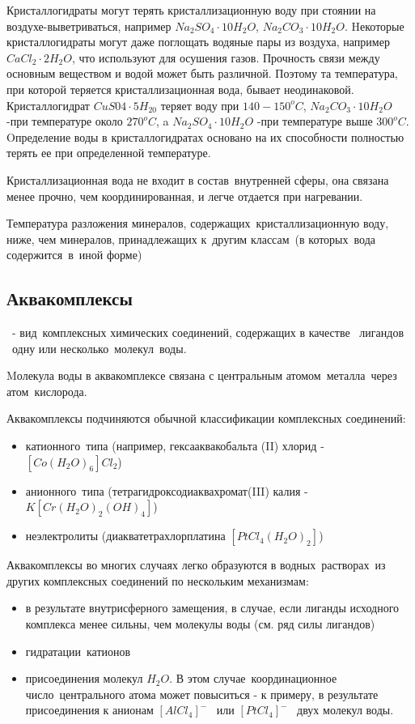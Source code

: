 \documentclass[11pt]{article}
\begin{document}
Кристаллогидраты могут терять кристаллизационную воду при стоянии на
воздухе-выветриваться, например $Na_2SO_4 \cdot 10H_2O$, $Na_2CO_3 \cdot 10H_2O$. Hекоторые
кристаллогидраты могут даже поглощать водяные пары из воздуха, например $CaCl_2 \cdot 2H_2O$, что используют для осушения газов. Прочность связи между основным
веществом и водой может быть различной. Поэтому та температура, при которой
теряется кристаллизационная вода, бывает неодинаковой. Кристаллогидрат $CuS04\cdot 5H_20$ теряет воду при $140-150^oC$, $Na_2CO_3\cdot 10H_2O$ -при температуре около $270^o C$, a
$Na_2SO_4\cdot 10H_2O$ -при температуре выше $300^o C$. Oпределение воды в
кристаллогидратах основано на их способности полностью терять ее при
определенной температуре. 

Кристаллизационная вода не входит в состав внутренней сферы, она связана менее прочно, чем координированная, и легче отдается при нагревании.

Температура разложения минералов, содержащих кристаллизационную воду, ниже,
чем минералов, принадлежащих к другим классам (в которых вода
содержится в иной форме)

\subsection{Аквакомплексы} - вид комплексных химических соединений, содержащих в
качестве  лигандов  одну или несколько молекул воды.

Mолекула воды в аквакомплексе связана с центральным атомом металла через
атом кислорода.

Аквакомплексы подчиняются обычной классификации комплексных соединений:
\begin{itemize}
 \item катионного типа (например, гексааквакобальта (II) хлорид - $[Co(H_2O)_6]Cl_2$)
 \item анионного типа (тетрагидроксодиаквахромат(III) калия - $K[Cr(H_2O)_2(OH)_4]$)
 \item неэлектролиты (диакватетрахлорплатина $[PtCl_4(H_2O)_2]$)
\end{itemize}
Аквакомплексы во многих случаях легко образуются в водных растворах из других
комплексных соединений по нескольким механизмам:
\begin{itemize}
\item в результате внутрисферного замещения, в случае, если лиганды исходного
комплекса менее сильны, чем молекулы воды (см. ряд силы лигандов)
\item гидратации катионов
\item присоединения молекул $H_2O$. В этом случае координационное
число центрального атома может повыситься - к примеру, в результате
присоединения к анионам $[AlCl_4]^-$  или $[PtCl_4]^-$  двух молекул воды.
\end{itemize}
\end{document}
